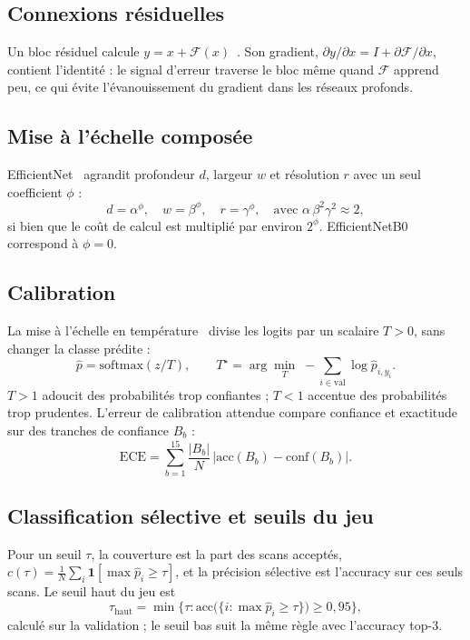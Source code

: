 \documentclass[conference]{IEEEtran}
\begin{document}
\subsection{Connexions résiduelles}
Un bloc résiduel calcule $y = x + \mathcal{F}(x)$~\cite{he2016resnet}. Son gradient, $\partial y / \partial x = I + \partial \mathcal{F} / \partial x$, contient l'identité : le signal d'erreur traverse le bloc même quand $\mathcal{F}$ apprend peu, ce qui évite l'évanouissement du gradient dans les réseaux profonds.

\subsection{Mise à l'échelle composée}
EfficientNet~\cite{tan2019} agrandit profondeur $d$, largeur $w$ et résolution $r$ avec un seul coefficient $\phi$ :
\begin{equation}\label{eq:scaling}
d = \alpha^{\phi},\quad w = \beta^{\phi},\quad r = \gamma^{\phi},\quad \text{avec } \alpha\,\beta^{2}\gamma^{2} \approx 2,
\end{equation}
si bien que le coût de calcul est multiplié par environ $2^{\phi}$. EfficientNetB0 correspond à $\phi = 0$.

\subsection{Calibration}
La mise à l'échelle en température~\cite{guo2017} divise les logits par un scalaire $T > 0$, sans changer la classe prédite :
\begin{equation}
\hat p = \mathrm{softmax}(z / T),\qquad T^\star = \arg\min_{T}\; -\sum_{i \in \mathrm{val}} \log \hat p_{i, y_i}.
\end{equation}
$T > 1$ adoucit des probabilités trop confiantes ; $T < 1$ accentue des probabilités trop prudentes. L'erreur de calibration attendue compare confiance et exactitude sur des tranches de confiance $B_b$ :
\begin{equation}
\mathrm{ECE} = \sum_{b=1}^{15} \frac{|B_b|}{N}\,\bigl|\mathrm{acc}(B_b) - \mathrm{conf}(B_b)\bigr|.
\end{equation}

\subsection{Classification sélective et seuils du jeu}
Pour un seuil $\tau$, la couverture est la part des scans acceptés, $c(\tau) = \frac{1}{N}\sum_i \mathbf{1}[\max \hat p_i \geq \tau]$, et la précision sélective est l'accuracy sur ces seuls scans. Le seuil haut du jeu est
\begin{equation}
\tau_{\mathrm{haut}} = \min\bigl\{\tau : \mathrm{acc}\bigl(\{i : \max \hat p_i \geq \tau\}\bigr) \geq 0{,}95\bigr\},
\end{equation}
calculé sur la validation ; le seuil bas suit la même règle avec l'accuracy top-3.
\end{document}
